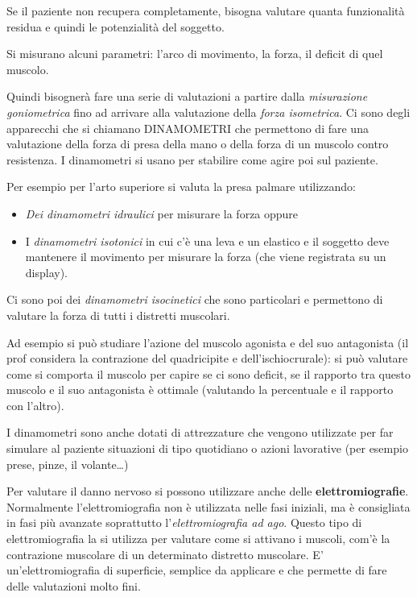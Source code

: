 Se il paziente non recupera completamente, bisogna valutare quanta
funzionalità residua e quindi le potenzialità del soggetto.

Si misurano alcuni parametri: l'arco di movimento, la forza, il deficit
di quel muscolo.

Quindi bisognerà fare una serie di valutazioni a partire dalla
\emph{misurazione goniometrica} fino ad arrivare alla valutazione della
\emph{forza isometrica}. Ci sono degli apparecchi che si chiamano
DINAMOMETRI che permettono di fare una valutazione della forza di presa
della mano o della forza di un muscolo contro resistenza. I dinamometri
si usano per stabilire come agire poi sul paziente.

Per esempio per l'arto superiore si valuta la presa palmare utilizzando:

\begin{itemize}
\item
  \emph{Dei dinamometri idraulici} per misurare la forza oppure
\item
  I \emph{dinamometri isotonici} in cui c'è una leva e un elastico e il
  soggetto deve mantenere il movimento per misurare la forza (che viene
  registrata su un display).
\end{itemize}

Ci sono poi dei \emph{dinamometri isocinetici} che sono particolari e
permettono di valutare la forza di tutti i distretti muscolari.

Ad esempio si può studiare l'azione del muscolo agonista e del suo
antagonista (il prof considera la contrazione del quadricipite e
dell'ischiocrurale): si può valutare come si comporta il muscolo per
capire se ci sono deficit, se il rapporto tra questo muscolo e il suo
antagonista è ottimale (valutando la percentuale e il rapporto con
l'altro).

I dinamometri sono anche dotati di attrezzature che vengono utilizzate
per far simulare al paziente situazioni di tipo quotidiano o azioni
lavorative (per esempio prese, pinze, il volante\ldots{})

Per valutare il danno nervoso si possono utilizzare anche delle
\textbf{elettromiografie}. Normalmente l'elettromiografia non è
utilizzata nelle fasi iniziali, ma è consigliata in fasi più avanzate
soprattutto l'\emph{elettromiografia ad ago}. Questo tipo di
elettromiografia la si utilizza per valutare come si attivano i muscoli,
com'è la contrazione muscolare di un determinato distretto muscolare. E'
un'elettromiografia di superficie, semplice da applicare e che permette
di fare delle valutazioni molto fini.

